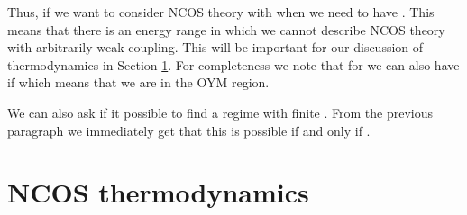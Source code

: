 \documentclass[a4paper,twoside,titlepage,12pt]{article}
\begin{document}
Thus, if we want to consider NCOS theory with \coordHE{} when \coordHE{}
we need to have \coordHE{}. 
This means that there is an energy range \coordHE{}
in which we cannot describe NCOS theory with arbitrarily weak coupling.
This will be important for our discussion of thermodynamics in 
Section \ref{secthermo}.
For completeness we note that for \coordHE{} we can also have
\coordHE{} if \coordHE{}
which means that we are in the OYM region.

We can also ask if it possible to find a regime with finite \coordHE{}. 
From the previous paragraph we immediately get that this is
possible if and only if \coordHE{}.


\section{NCOS thermodynamics}
\label{secthermo}
\end{document}

